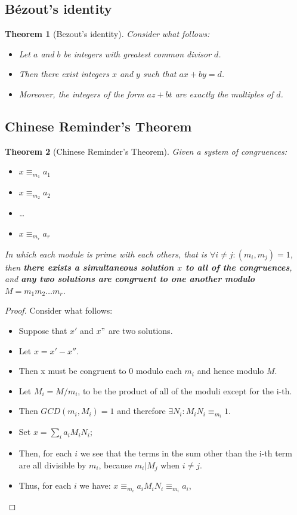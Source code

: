 \documentclass[12pt, a4paper, english]{report}
\newtheorem{theorem}{Theorem}
\begin{document}
\subsection{Bézout's identity}
\begin{theorem}[Bezout's identity]
    Consider what follows:
    \begin{itemize}
        \item Let $a$ and $b$ be integers with greatest common divisor $d$.
        \item Then there exist integers $x$ and $y$ such that $ax + by = d$.
        \item Moreover, the integers of the form $az + bt$ are exactly the multiples of $d$.
    \end{itemize}
\end{theorem}

\subsection{Chinese Reminder's Theorem}
\begin{theorem}[Chinese Reminder's Theorem]
    Given a system of congruences:
    \begin{itemize}
        \item $x \equiv_{m_{1}} a_{1}$
        \item $x \equiv_{m_{2}} a_{2}$
        \item \dots
        \item $x \equiv_{m_{r}} a_{r}$
    \end{itemize}
    In which each module is prime with each others, that is $\forall i \neq j: (m_{i}, m_{j}) = 1$,
    then \textbf{there exists a simultaneous solution $x$ to all of the congruences}, and \textbf{any two solutions are congruent to one another modulo $M = m_{1}m_{2}\dots m_{r}$}.
\end{theorem}

\begin{proof}
    Consider what follows:
    \begin{itemize}
        \item Suppose that $x'$ and $x"$ are two solutions.
        \item Let $x = x' - x''$.
        \item Then x must be congruent to $0$ modulo each $m_{i}$ and hence modulo $M$.
        \item Let $M_{i} = M/m_{i}$, to be the product of all of the moduli except for the i-th.
        \item Then $GCD(m_{i}, M_{i}) = 1$ and therefore $\exists N_{i}: M_{i}N_{i} \equiv_{m_{i}} 1$.
        \item Set $x = \sum_{i}a_{i}M_{i}N_{i}$;
        \item Then, for each $i$ we see that the terms in the sum other than the i-th term are all divisible by $m_{i}$, because $m_{i} | M_{j}$ when $i \neq j$.
        \item Thus, for each $i$ we have: $x \equiv_{m_{i}} a_{i}M_{i}N_{i} \equiv_{m_{i}} a_{i}$,
    \end{itemize}
\end{proof}
\end{document}
